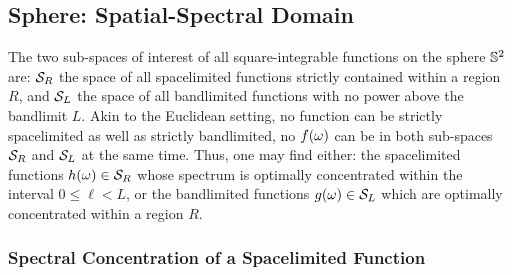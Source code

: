 \subsection{Sphere: Spatial-Spectral Domain}\label{sec:chapter2_slepian_sphere}

The two sub-spaces of interest of all square-integrable functions on the sphere \(\mathbb{S}^{2}{}\) are: \(\mathcal{S}_{R}{}\) the space of all spacelimited functions strictly contained within a region \(R\), and \(\mathcal{S}_{L}{}\) the space of all bandlimited functions with no power above the bandlimit \(L\).
Akin to the Euclidean setting, no function can be strictly spacelimited as well as strictly bandlimited, \ie{} no \(f(\omega)\) can be in both sub-spaces \(\mathcal{S}_{R}{}\) and \(\mathcal{S}_{L}{}\) at the same time.
Thus, one may find either: the spacelimited functions \(h(\omega) \in \mathcal{S}_{R}{}\) whose spectrum is optimally concentrated within the interval \(0 \leq \ell < L\), or the bandlimited functions \(g(\omega) \in \mathcal{S}_{L}{}\) which are optimally concentrated within a region \(R\).

\subsubsection{Spectral Concentration of a Spacelimited Function}

